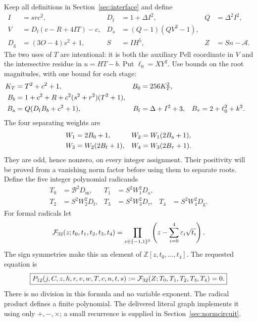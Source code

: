 \documentclass[11pt,a4paper]{article}
\theoremstyle{definition}\newtheorem{definition}[theorem]{Definition}
\theoremstyle{remark}\newtheorem{remark}[theorem]{Remark}
\newcommand{\Z}{\mathbb Z}\newcommand{\Q}{\mathbb Q}\newcommand{\N}{\mathbb N}\newcommand{\R}{\mathbb R}
\newcommand{\Dm}{D_{\mathrm m}}\newcommand{\Df}{D_{\mathrm f}}
\newcommand{\Dt}{D_{\tau}}\newcommand{\Da}{D_{\mathrm a}}
\newcommand{\Dg}{D_{\mathrm g}}\newcommand{\Pair}{\operatorname{Pair}}
\numberwithin{equation}{section}
\begin{document}
Keep all definitions in Section~\ref{sec:interface} and define
\begin{align}
 I&=src^2,&\Df&=1+\Delta I^2,&Q&=\Delta^2I^2,\nonumber\\
 V&=\Df(c-R+4IT)-c,&
 \Da&=(Q-1)(QV^2-1),\nonumber\\
 \Dg&=(3O-4)s^2+1,&S&=IH^5,&Z&=Sn-\mathcal A.
 \label{eq:strong12}
\end{align}
The two uses of $T$ are intentional: it is both the auxiliary Pell
coordinate in $V$ and the intersective residue in $u=HT-b$.
Put $\ell_0=XY^2$. Use bounds on the root magnitudes, with one bound
for each stage:
\begin{align}
 K_T&=T^2+c^2+1,&B_0&=256K_T^2,\nonumber\\
 B_b&=1+c^2+R+c^2(s^2+r^2)(T^2+1),\nonumber\\
 B_{\rm a}&=Q(\Df B_b+c^2+1),&
 B_{\rm f}&=\Delta+I^2+3,&B_{\tau}&=2+\ell_0^2+k^2.
 \label{eq:bounds12}
\end{align}
The four separating weights are
\begin{align}
 W_1&=2B_0+1,&W_2&=W_1(2B_{\rm a}+1),\nonumber\\
 W_3&=W_2(2B_{\rm f}+1),&
 W_4&=W_3(2B_\tau+1).
 \label{eq:weight12}
\end{align}
They are odd, hence nonzero, on every integer assignment. Their positivity
will be proved from a vanishing norm factor before using them to separate
roots. Define the five integer polynomial radicands
\begin{align}
 T_0&=\mathcal B^2\Dm,&T_1&=S^2W_1^2\Da,\nonumber\\
 T_2&=S^2W_2^2\Df,&T_3&=S^2W_3^2\Dt,&T_4&=S^2W_4^2\Dg.
 \label{eq:radicands12}
\end{align}
For formal radicals let
\begin{equation}
 \mathcal F_{32}(z;t_0,t_1,t_2,t_3,t_4)
   =\prod_{\varepsilon\in\{-1,1\}^5}
       \left(z-\sum_{i=0}^4\varepsilon_i\sqrt{t_i}\right).
 \label{eq:norm32}
\end{equation}
The sign symmetries make this an element of
$\Z[z,t_0,\ldots,t_4]$. The requested equation is
\begin{equation}
 \boxed{P_{12}(j,C,z,h,r,v,w,T,c,n,t,s)
       :=\mathcal F_{32}(Z;T_0,T_1,T_2,T_3,T_4)=0.}
 \label{eq:main12}
\end{equation}
There is no division in this formula and no variable exponent. The
radical product defines a finite polynomial. The delivered literal graph
implements it using only $+,-,\times$; a small recurrence is supplied
in Section~\ref{sec:normcircuit}.
\end{document}
